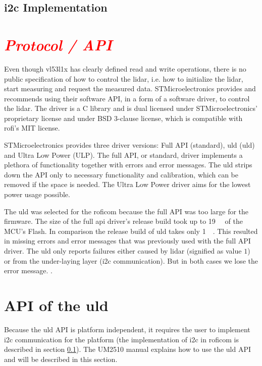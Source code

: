 \documentclass[
  digital,     %
  oneside,     %
  nosansbold,  %
  nocolorbold, %
  lof,         %
  lot,         %
]{fithesis4}
\newcommand{\TODO}[1]{\textcolor{red}{\textit{#1}}}
\begin{document}
\subsection[ I2C Implementation ]{ \acrshort{i2c} Implementation } \label{lidar-i2c-impl}


\section{ \TODO{Protocol / API} }
Even though \gls{vl53l1x} has clearly defined read and write operations, there is no public specification of how to control the \acrshort{lidar}, i.e. how to initialize the \acrshort{lidar}, start measuring and request the measured data. STMicroelectronics provides and recommends using their software API, in a form of a software driver, to control the \acrshort{lidar}. The driver is a C library and is dual licensed under STMicroelectronics' proprietary license and under BSD 3-clause license, which is compatible with \acrshort{rofi}'s MIT license.

STMicroelectronics provides three driver versions: Full API (standard), \acrlong{uld} (\acrshort{uld}) and Ultra Low Power (ULP). The full API, or standard, driver implements a plethora of functionality together with errors and error messages. The \acrlong{uld} strips down the API only to necessary functionality and calibration, which can be removed if the space is needed. The Ultra Low Power driver aims for the lowest power usage possible.

The \acrlong{uld} was selected for the \acrshort{roficom} because the full API was too large for the firmware. The size of the full api driver's release build took up to \qty{19}{\kilo\byte} of the MCU's Flash. In comparison the release build of \acrlong{uld} takes only \qty{1}{\kilo\byte}. This resulted in missing errors and error messages that was previously used with the full API driver. The \acrshort{uld} only reports failures either caused by lidar (signified as value $1$) or from the under-laying layer (\acrshort{i2c} communication). But in both cases we lose the error message. .

\section[ API of the Ultra Lite Driver ]{ API of the \acrlong{uld} }
Because the \acrshort{uld} API is platform independent, it requires the user to implement \acrshort{i2c} communication for the platform (the implementation of \acrshort{i2c} in \acrshort{roficom} is described in section \ref{lidar-i2c-impl}). The UM2510 \cite{um2510} manual explains how to use the \acrshort{uld} API and will be described in this section.
\end{document}
